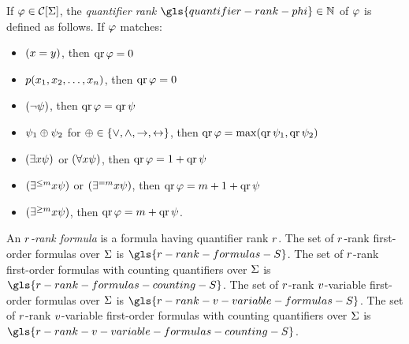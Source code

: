 
If $\varphi \in \mathcal{C}[\mathrm{\Sigma}]$, the \emph{quantifier rank}
$\gls{quantifier-rank-phi} \in \Nats$ of $\varphi$ is defined as follows. If
$\varphi$ matches:
\begin{itemize}
  \item $(x = y)$, then $\operatorname{qr}\varphi = 0$
  \item $p(x_{1}, x_{2}, \dots, x_{n})$, then $\operatorname{qr}\varphi = 0$
  \item $(\lnot\psi)$, then $\operatorname{qr}\varphi = \operatorname{qr}\psi$
  \item $\psi_1 \oplus \psi_2$
  for $\oplus \in \left\{\lor,\land,\rightarrow,\leftrightarrow\right\}$,
  then $\operatorname{qr}\varphi = \max(\operatorname{qr}{\psi_1},\operatorname{qr}{\psi_2})$
  \item $(\exists x \psi)$ or $(\forall x \psi)$,
  then $\operatorname{qr}\varphi = 1 +\operatorname{qr}\psi$
  \item $(\exists^{\leq m}x\psi)$ or $(\exists^{=m}x\psi)$,
  then $\operatorname{qr}\varphi = m + 1 + \operatorname{qr}\psi$
  \item $(\exists^{\geq m}x\psi)$, then $\operatorname{qr}\varphi = m + \operatorname{qr}\psi$. 
\end{itemize}
An \emph{$r$-rank formula} is a formula having quantifier rank $r$.
The set of $r$-rank first-order formulas over $\mathrm{\Sigma}$ is
$\gls{r-rank-formulas-S}$.
The set of $r$-rank first-order formulas with counting quantifiers over
$\mathrm{\Sigma}$ is $\gls{r-rank-formulas-counting-S}$.
The set of $r$-rank $v$-variable first-order formulas over $\mathrm{\Sigma}$ is
$\gls{r-rank-v-variable-formulas-S}$.
The set of $r$-rank $v$-variable first-order formulas with counting
quantifiers over $\mathrm{\Sigma}$ is $\gls{r-rank-v-variable-formulas-counting-S}$.